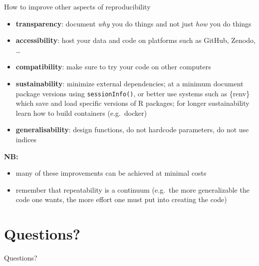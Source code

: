 \documentclass[
  ignorenonframetext,
  aspectratio=169,
  t]{beamer}
\providecommand{\tightlist}{%
  \setlength{\itemsep}{0pt}\setlength{\parskip}{0pt}}
\let\oldtexttt\texttt
\renewcommand{\texttt}[1]{\colorbox{gray!20}{\oldtexttt{#1}}}
\begin{document}
\begin{frame}[fragile]{How to improve other aspects of reproducibility}
\protect{}\label{how-to-improve-other-aspects-of-reproducibility}
\begin{itemize}[<+->]
\tightlist
\item
  \textbf{transparency}: document \emph{why} you do things and not just
  \emph{how} you do things
\item
  \textbf{accessibility}: host your data and code on platforms such as
  GitHub, Zenodo, \ldots{}
\item
  \textbf{compatibility}: make sure to try your code on other computers
\item
  \textbf{sustainability}: minimize external dependencies; at a minimum
  document package versions using \texttt{sessionInfo()}, or better use
  systems such as \{renv\} which save and load specific versions of R
  packages; for longer sustainability learn how to build containers
  (e.g.~docker)
\item
  \textbf{generalisability}: design functions, do not hardcode
  parameters, do not use indices
\end{itemize}

\pause

\vspace{1cm}

\textbf{NB:}

\begin{itemize}
\tightlist
\item
  many of these improvements can be achieved at minimal costs
\item
  remember that repeatability is a continuum (e.g.~the more
  generalizable the code one wants, the more effort one must put into
  creating the code)
\end{itemize}
\end{frame}

\section*{Questions?}\label{questions}

\begin{frame}[c]{}
\protect{}\label{section}
\centering

\Large Questions?
\end{frame}
\end{document}
